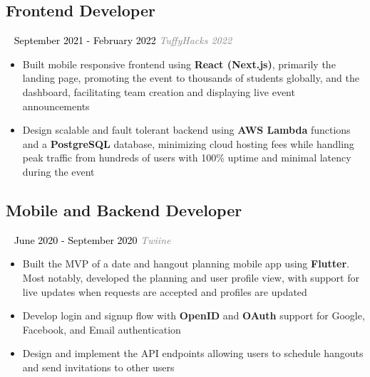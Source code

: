 \documentclass{article}
\newcommand{\resumesection}[3]{
    \subsection*{#1}
    \ 
    \normalsize
    \normalsize
    \hfill
    \textcolor{black}{#3}
    \normalsize
    \newline
    \small
    \textcolor{grey}{\emph{#2}}
}
\begin{document}
\resumesection{Frontend Developer}{TuffyHacks 2022}{September 2021 - February 2022}
\begin{itemize}
    \item Built mobile responsive frontend using \textbf{React (Next.js)}, primarily the landing page, promoting the event to thousands of students globally, and the dashboard, facilitating team creation and displaying live event announcements
    \item Design scalable and fault tolerant backend using \textbf{AWS Lambda} functions and a \textbf{PostgreSQL} database, minimizing cloud hosting fees while handling peak traffic from hundreds of users with 100\% uptime and minimal latency during the event
\end{itemize}
\resumesection{Mobile and Backend Developer}{Twiine}{June 2020 - September 2020}
\begin{itemize}
    \item Built the MVP of a date and hangout planning mobile app using \textbf{Flutter}. Most notably, developed the planning and user profile view, with support for live updates when requests are accepted and profiles are updated
    \item Develop login and signup flow with \textbf{OpenID} and \textbf{OAuth} support for Google, Facebook, and Email authentication
    \item Design and implement the API endpoints allowing users to schedule hangouts and send invitations to other users
\end{itemize}
\end{document}
